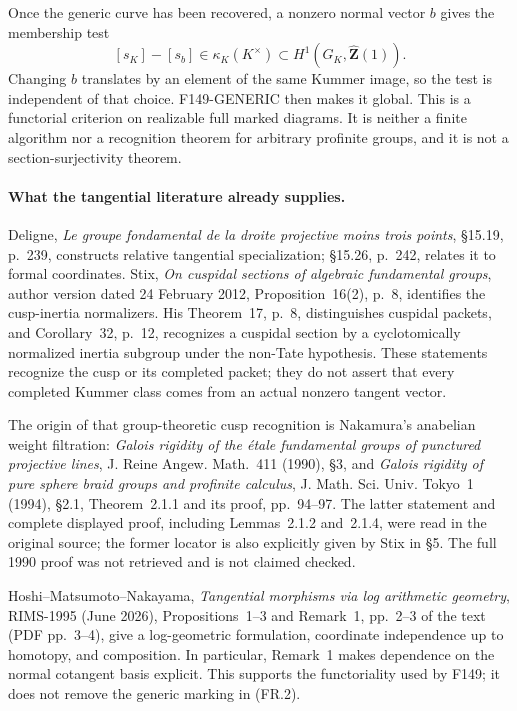 Once the generic curve has been recovered, a nonzero normal
vector $b$ gives the membership test
\[
 [s_K]-[s_b]\in\kappa_K(K^\times)
       \subset H^1(G_K,\widehat{\mathbf Z}(1)).             \tag{FR.2}
\]
Changing $b$ translates by an element of the same Kummer
image, so the test is independent of that choice. F149-GENERIC
then makes it global. This is a functorial criterion on
realizable full marked diagrams. It is neither a finite
algorithm nor a recognition theorem for arbitrary profinite
groups, and it is not a section-surjectivity theorem.

\paragraph{What the tangential literature already supplies.}
Deligne, \emph{Le groupe fondamental de la droite projective
moins trois points}, \S15.19, p.~239, constructs relative
tangential specialization; \S15.26, p.~242, relates it to
formal coordinates. Stix, \emph{On cuspidal sections of
algebraic fundamental groups}, author version dated
24 February 2012, Proposition~16(2), p.~8, identifies the
cusp-inertia normalizers. His Theorem~17, p.~8, distinguishes
cuspidal packets, and Corollary~32, p.~12, recognizes a
cuspidal section by a cyclotomically normalized inertia
subgroup under the non-Tate hypothesis. These statements
recognize the cusp or its completed packet; they do not
assert that every completed Kummer class comes from an
actual nonzero tangent vector.

The origin of that group-theoretic cusp recognition is
Nakamura's anabelian weight filtration: \emph{Galois rigidity
of the \'etale fundamental groups of punctured projective
lines}, J. Reine Angew. Math.~411 (1990), \S3, and
\emph{Galois rigidity of pure sphere braid groups and
profinite calculus}, J. Math. Sci. Univ. Tokyo~1 (1994),
\S2.1, Theorem~2.1.1 and its proof, pp.~94--97. The latter
statement and complete displayed proof, including
Lemmas~2.1.2 and~2.1.4, were read in the original source;
the former locator is also explicitly given by Stix in \S5. The full
1990 proof was not retrieved and is not claimed checked.

Hoshi--Matsumoto--Nakayama, \emph{Tangential morphisms via
log arithmetic geometry}, RIMS-1995 (June 2026),
Propositions~1--3 and Remark~1, pp.~2--3 of the text
(PDF pp.~3--4), give a log-geometric formulation, coordinate
independence up to homotopy, and composition. In particular,
Remark~1 makes dependence on the normal cotangent basis
explicit. This supports the functoriality used by F149; it
does not remove the generic marking in (FR.2).

